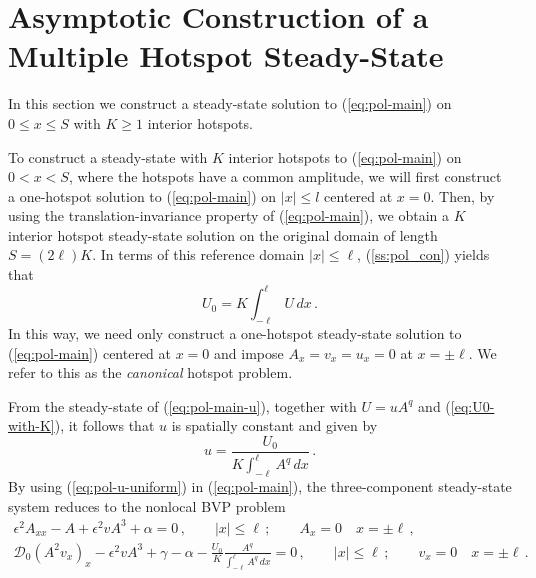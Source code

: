 \documentclass{article}%
\newcommand{\bsub}{\begin{subequations}}
\newcommand{\esub}{\end{subequations}$\!$}
\begin{document}
\setcounter{equation}{0}
\setcounter{section}{1}
\section{\label{sec:pol-construction}Asymptotic Construction of a Multiple
Hotspot Steady-State}

In this section we construct a steady-state solution to
(\ref{eq:pol-main}) on $0\leq x\leq S$ with $K\geq 1$ interior
hotspots. 

To construct a steady-state with $K$ interior hotspots to
(\ref{eq:pol-main}) on $0<x<S$, where the hotspots have a common
amplitude, we will first construct a one-hotspot solution to
(\ref{eq:pol-main}) on $|x|\leq l$ centered at $x=0$. Then, by using
the translation-invariance property of (\ref{eq:pol-main}), we obtain
a $K$ interior hotspot steady-state solution on the original domain of
length $S=(2\ell)K$. In terms of this reference domain $|x|\leq \ell$,
(\ref{ss:pol_con}) yields that
\begin{equation}
U_{0}=K\int_{-\ell}^{\ell}U\, dx \,. \label{eq:U0-with-K}
\end{equation}
In this way, we need only construct a one-hotspot steady-state
solution to (\ref{eq:pol-main}) centered at $x=0$ and impose
$A_x=v_x=u_x=0$ at $x=\pm \ell$. We refer to this as the {\em
  canonical} hotspot problem.

From the steady-state of (\ref{eq:pol-main-u}), together with
$U=uA^{q}$ and (\ref{eq:U0-with-K}), it follows that $u$ is spatially 
constant and given by
\begin{equation}
u=\frac{U_{0}}{K\int_{-\ell}^{\ell}A^{q}\, dx} \,. \label{eq:pol-u-uniform}
\end{equation}
By using (\ref{eq:pol-u-uniform}) in (\ref{eq:pol-main}), the 
three-component steady-state system reduces to the nonlocal BVP
problem 
\bsub\label{eq:pol-stdy}
\begin{gather}
\epsilon^{2}A_{xx}-A+\epsilon^{2}vA^{3}+\alpha=0\,,\qquad |x|\leq \ell\,;
 \qquad A_x=0 \quad x=\pm \ell \,, \label{eq:pol-stdy-A}\\
{\mathcal D}_{0}\left(A^{2}v_{x}\right)_{x}-\epsilon^{2}vA^{3}+\gamma-\alpha-
\frac{U_{0}}{K}\frac{A^{q}}{\int_{-\ell}^{\ell}A^{q}\, dx}=0\,, \qquad
 |x|\leq \ell\,; \qquad v_x=0 \quad x=\pm \ell \,. \label{eq:pol-stdy-v}
\end{gather}
\esub
\end{document}
